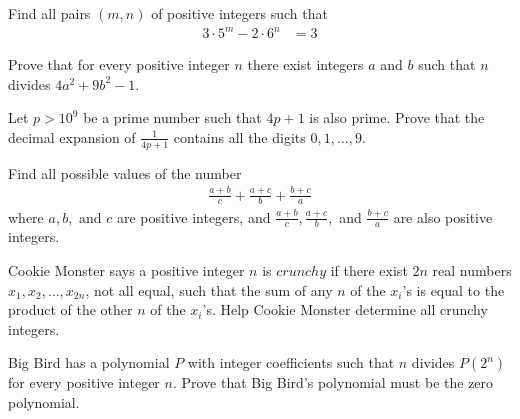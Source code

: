 \documentclass[problems.tex]{subfile}
\begin{document}
	\begin{problem}
		Find all pairs $(m, n)$ of positive integers such that
		\begin{align*}
			3 \cdot 5^m - 2\cdot 6^n
				& = 3
		\end{align*}
	\end{problem}

	\begin{problem}
		Prove that for every positive integer $n$ there exist integers $a$ and $b$ such that $n$ divides $4a^2 + 9b^2 - 1$.
	\end{problem}

	\begin{problem}
		Let $p > 10^9$ be a prime number such that $4p + 1$ is also prime.
		Prove that the decimal expansion of $\frac{1}{4p+1}$ contains all the digits $0,1, \ldots, 9$. %
	\end{problem}

	\begin{problem}
		Find all possible values of the number
		\begin{align*}
			\frac{a+b}{c}+ \frac{a+c}{b}+ \frac{b+c}{a}
		\end{align*}
		where $a, b,$ and $c$ are positive integers, and $\frac{a+b}{c}, \frac{a+c}{b},$ and $\frac{b+c}{a}$ are also positive integers.
	\end{problem}

	\begin{problem}[ELMO 2016]
		Cookie Monster says a positive integer $n$ is $crunchy$ if there exist $2n$ real numbers $x_1,x_2,\ldots,x_{2n}$, not all equal, such that the sum of any $n$ of the $x_i$'s is equal to the product of the other $n$ of the $x_i$'s. Help Cookie Monster determine all crunchy integers. %
	\end{problem}

	\begin{problem}[ELMO $2016$]
		Big Bird has a polynomial $P$ with integer coefficients such that $n$ divides $P(2^n)$ for every positive integer $n$. Prove that Big Bird's polynomial must be the zero polynomial. %
	\end{problem}
\end{document}
